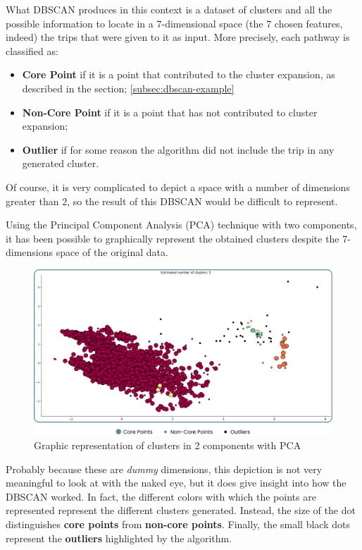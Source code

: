 What DBSCAN produces in this context is a dataset of clusters and all the possible information to locate in a 7-dimensional space (the 7 chosen features, indeed) the trips that were given to it as input.
More precisely, each pathway is classified as:
\begin{itemize}
\item \textbf{Core Point} if it is a point that contributed to the cluster expansion, as described in the section; \ref{subsec:dbscan-example}
\item \textbf{Non-Core Point} if it is a point that has not contributed to cluster expansion;
\item \textbf{Outlier} if for some reason the algorithm did not include the trip in any generated cluster.
\end{itemize}

Of course, it is very complicated to depict a space with a number of dimensions greater than 2, so the result of this DBSCAN would be difficult to represent.

Using the Principal Component Analysis (PCA) technique with two components, it has been possible to graphically represent the obtained clusters despite the 7-dimensions space of the original data.

\begin{figure}[H]
    \centering
    \includegraphics[width=13cm]{Images/3/clusters.png}
    \caption{Graphic representation of clusters in 2 components with PCA}
\end{figure}

Probably because these are \textit{dummy} dimensions, this depiction is not very meaningful to look at with the naked eye, but it does give insight into how the DBSCAN worked. In fact, the different colors with which the points are represented represent the different clusters generated. Instead, the size of the dot distinguishes \textbf{core points} from \textbf{non-core points}. Finally, the small black dots represent the \textbf{outliers} highlighted by the algorithm.

